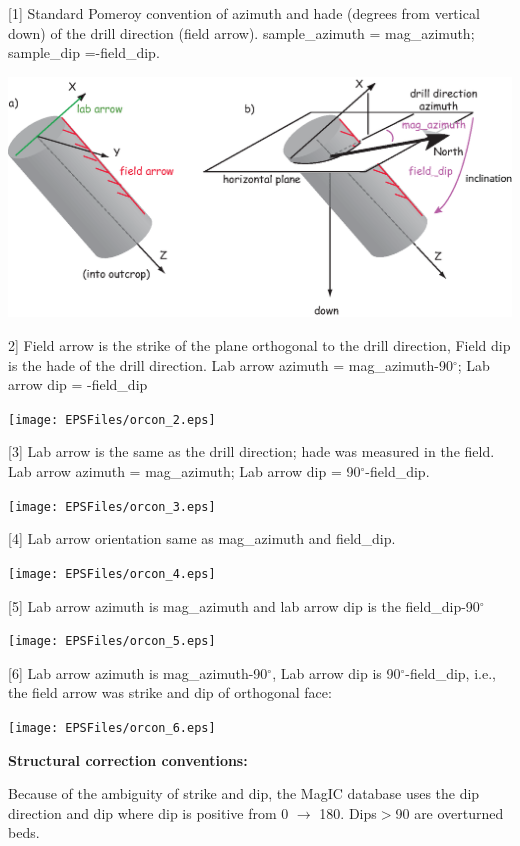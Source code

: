 \documentclass[11pt]{book}
\begin{document}
{{{\parindent 0pt
[1] Standard Pomeroy convention of azimuth and hade (degrees from vertical down) of the drill direction (field arrow). sample\_azimuth = mag\_azimuth; sample\_dip =-field\_dip.

  \includegraphics[width=15cm]{EPSFiles/orcon_1.eps}

  2] Field arrow is the strike of the plane orthogonal to the drill direction, Field dip is the hade of the drill direction. Lab arrow azimuth = mag\_azimuth-90$^{\circ}$; Lab arrow dip = -field\_dip

    \texttt{[image: EPSFiles/orcon\_2.eps]}

  [3] Lab arrow is the same as the drill direction; hade was measured in the field. Lab arrow azimuth = mag\_azimuth; Lab arrow dip = 90$^{\circ}$-field\_dip.

      \texttt{[image: EPSFiles/orcon\_3.eps]}

  [4] Lab arrow orientation same as mag\_azimuth and field\_dip.

        \texttt{[image: EPSFiles/orcon\_4.eps]}

        [5]  Lab arrow azimuth is  mag\_azimuth and lab arrow dip is the  field\_dip-90$^{\circ}$

               \texttt{[image: EPSFiles/orcon\_5.eps]}


 [6] Lab arrow azimuth is mag\_azimuth-90$^{\circ}$, Lab arrow dip is 90$^{\circ}$-field\_dip, i.e., the field arrow was strike and dip of orthogonal face:

                \texttt{[image: EPSFiles/orcon\_6.eps]}
                }

{\bf Structural correction conventions:}


Because of the ambiguity of strike and dip, the MagIC database uses the dip direction and dip where dip is positive from 0 $\rightarrow$ 180. Dips$ > $90 are overturned beds.


}}
\end{document}
